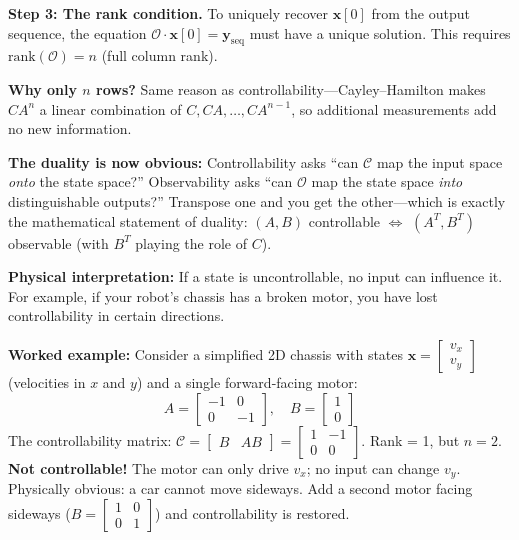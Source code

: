 \begin{mdframed}[linewidth=1pt, innertopmargin=10pt, innerbottommargin=10pt]
\textbf{Step 3: The rank condition.} To uniquely recover $\mathbf{x}[0]$ from the output sequence, the equation $\mathcal{O} \cdot \mathbf{x}[0] = \mathbf{y}_{\text{seq}}$ must have a unique solution. This requires $\text{rank}(\mathcal{O}) = n$ (full column rank).

\textbf{Why only $n$ rows?} Same reason as controllability---Cayley--Hamilton makes $CA^n$ a linear combination of $C, CA, \ldots, CA^{n-1}$, so additional measurements add no new information.

\textbf{The duality is now obvious:} Controllability asks ``can $\mathcal{C}$ map the input space \textit{onto} the state space?'' Observability asks ``can $\mathcal{O}$ map the state space \textit{into} distinguishable outputs?'' Transpose one and you get the other---which is exactly the mathematical statement of duality: $(A, B)$ controllable $\Leftrightarrow$ $(A^T, B^T)$ observable (with $B^T$ playing the role of $C$).
\end{mdframed}

\textbf{Physical interpretation:} If a state is uncontrollable, no input can influence it. For example, if your robot's chassis has a broken motor, you have lost controllability in certain directions.

\textbf{Worked example:} Consider a simplified 2D chassis with states $\mathbf{x} = \begin{bmatrix} v_x \\ v_y \end{bmatrix}$ (velocities in $x$ and $y$) and a single forward-facing motor:
\[
A = \begin{bmatrix} -1 & 0 \\ 0 & -1 \end{bmatrix}, \quad B = \begin{bmatrix} 1 \\ 0 \end{bmatrix}
\]
The controllability matrix: $\mathcal{C} = \begin{bmatrix} B & AB \end{bmatrix} = \begin{bmatrix} 1 & -1 \\ 0 & 0 \end{bmatrix}$. Rank = 1, but $n = 2$. \textbf{Not controllable!} The motor can only drive $v_x$; no input can change $v_y$. Physically obvious: a car cannot move sideways. Add a second motor facing sideways ($B = \begin{bmatrix} 1 & 0 \\ 0 & 1 \end{bmatrix}$) and controllability is restored.


